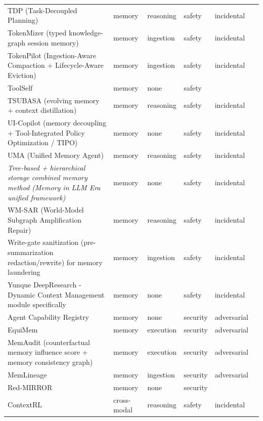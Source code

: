 \begin{longtable}{@{}>{\raggedright\arraybackslash}p{}lllll@{}}
TDP (Task-Decoupled Planning) & memory & reasoning & safety & incidental & \cite{li-2026-entangled} \\
TokenMizer (typed knowledge-graph session memory) & memory & ingestion & safety & incidental & \cite{mishra-2026-tokenmizer} \\
TokenPilot (Ingestion-Aware Compaction + Lifecycle-Aware Eviction) & memory & ingestion & safety & incidental & \cite{xu-2026-tokenpilot} \\
ToolSelf & memory & none & safety &  & \cite{zhou-2026-toolself} \\
TSUBASA (evolving memory + context distillation) & memory & reasoning & safety & incidental & \cite{zhang-2026-tsubasa} \\
UI-Copilot (memory decoupling + Tool-Integrated Policy Optimization / TIPO) & memory & none & safety & incidental & \cite{lu-2026-uicopilot} \\
UMA (Unified Memory Agent) & memory & reasoning & safety & incidental & \cite{zhang-2026-learning} \\
\emph{Tree-based + hierarchical storage combined memory method (Memory in LLM Era unified framework)} & memory & none & safety & incidental & \cite{wu-2026-memory} \\
WM-SAR (World-Model Subgraph Amplification Repair) & memory & reasoning & safety & incidental & \cite{song-2026-repair} \\
Write-gate sanitization (pre-summarization redaction/rewrite) for memory laundering & memory & ingestion & safety & incidental & \cite{wang-2026-state} \\
Yunque DeepResearch - Dynamic Context Management module specifically & memory & none & safety & incidental & \cite{cai-2026-yunque} \\
Agent Capability Registry & memory & none & security & adversarial & \cite{cai-2026-child} \\
EquiMem & memory & execution & security & adversarial & \cite{meng-2026-equimem} \\
MemAudit (counterfactual memory influence score + memory consistency graph) & memory & execution & security & adversarial & \cite{tan-2026-memaudit} \\
MemLineage & memory & ingestion & security & adversarial & \cite{ouyang-2026-memlineage} \\
Red-MIRROR & memory & none & security &  & \cite{khang-2026-redmirror} \\
ContextRL & cross-modal & reasoning & safety & incidental & \cite{xu-2026-contextaware} \\

\end{longtable}
